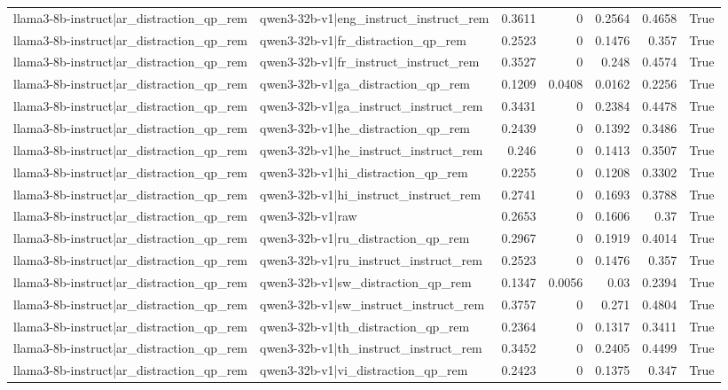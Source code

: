\begin{table}
\begin{tabular}{l l r r r r l}
llama3-8b-instruct|ar_distraction_qp_rem & qwen3-32b-v1|eng_instruct_instruct_rem & 0.3611 & 0 & 0.2564 & 0.4658 & True \\
llama3-8b-instruct|ar_distraction_qp_rem & qwen3-32b-v1|fr_distraction_qp_rem & 0.2523 & 0 & 0.1476 & 0.357 & True \\
llama3-8b-instruct|ar_distraction_qp_rem & qwen3-32b-v1|fr_instruct_instruct_rem & 0.3527 & 0 & 0.248 & 0.4574 & True \\
llama3-8b-instruct|ar_distraction_qp_rem & qwen3-32b-v1|ga_distraction_qp_rem & 0.1209 & 0.0408 & 0.0162 & 0.2256 & True \\
llama3-8b-instruct|ar_distraction_qp_rem & qwen3-32b-v1|ga_instruct_instruct_rem & 0.3431 & 0 & 0.2384 & 0.4478 & True \\
llama3-8b-instruct|ar_distraction_qp_rem & qwen3-32b-v1|he_distraction_qp_rem & 0.2439 & 0 & 0.1392 & 0.3486 & True \\
llama3-8b-instruct|ar_distraction_qp_rem & qwen3-32b-v1|he_instruct_instruct_rem & 0.246 & 0 & 0.1413 & 0.3507 & True \\
llama3-8b-instruct|ar_distraction_qp_rem & qwen3-32b-v1|hi_distraction_qp_rem & 0.2255 & 0 & 0.1208 & 0.3302 & True \\
llama3-8b-instruct|ar_distraction_qp_rem & qwen3-32b-v1|hi_instruct_instruct_rem & 0.2741 & 0 & 0.1693 & 0.3788 & True \\
llama3-8b-instruct|ar_distraction_qp_rem & qwen3-32b-v1|raw & 0.2653 & 0 & 0.1606 & 0.37 & True \\
llama3-8b-instruct|ar_distraction_qp_rem & qwen3-32b-v1|ru_distraction_qp_rem & 0.2967 & 0 & 0.1919 & 0.4014 & True \\
llama3-8b-instruct|ar_distraction_qp_rem & qwen3-32b-v1|ru_instruct_instruct_rem & 0.2523 & 0 & 0.1476 & 0.357 & True \\
llama3-8b-instruct|ar_distraction_qp_rem & qwen3-32b-v1|sw_distraction_qp_rem & 0.1347 & 0.0056 & 0.03 & 0.2394 & True \\
llama3-8b-instruct|ar_distraction_qp_rem & qwen3-32b-v1|sw_instruct_instruct_rem & 0.3757 & 0 & 0.271 & 0.4804 & True \\
llama3-8b-instruct|ar_distraction_qp_rem & qwen3-32b-v1|th_distraction_qp_rem & 0.2364 & 0 & 0.1317 & 0.3411 & True \\
llama3-8b-instruct|ar_distraction_qp_rem & qwen3-32b-v1|th_instruct_instruct_rem & 0.3452 & 0 & 0.2405 & 0.4499 & True \\
llama3-8b-instruct|ar_distraction_qp_rem & qwen3-32b-v1|vi_distraction_qp_rem & 0.2423 & 0 & 0.1375 & 0.347 & True \\

\end{tabular}
\end{table}

